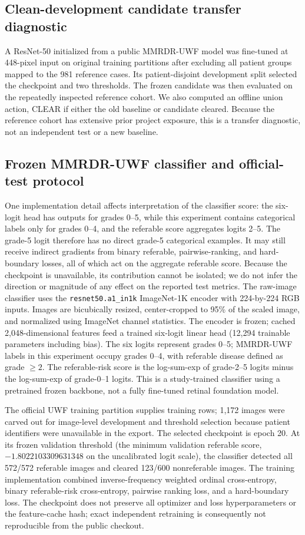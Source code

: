 \documentclass[11pt]{article}
\begin{document}
\subsection{Clean-development candidate transfer diagnostic}
A ResNet-50 initialized from a public MMRDR-UWF model was fine-tuned at 448-pixel input on original training partitions after excluding all patient groups mapped to the 981 reference cases. Its patient-disjoint development split selected the checkpoint and two thresholds. The frozen candidate was then evaluated on the repeatedly inspected reference cohort. We also computed an offline union action, CLEAR if either the old baseline or candidate cleared. Because the reference cohort has extensive prior project exposure, this is a transfer diagnostic, not an independent test or a new baseline.

\subsection{Frozen MMRDR-UWF classifier and official-test protocol}
One implementation detail affects interpretation of the classifier score: the six-logit head has outputs for grades 0--5, while this experiment contains categorical labels only for grades 0--4, and the referable score aggregates logits 2--5. The grade-5 logit therefore has no direct grade-5 categorical examples. It may still receive indirect gradients from binary referable, pairwise-ranking, and hard-boundary losses, all of which act on the aggregate referable score. Because the checkpoint is unavailable, its contribution cannot be isolated; we do not infer the direction or magnitude of any effect on the reported test metrics.
The raw-image classifier uses the \texttt{resnet50.a1\_in1k} ImageNet-1K encoder with 224-by-224 RGB inputs. Images are bicubically resized, center-cropped to 95\% of the scaled image, and normalized using ImageNet channel statistics. The encoder is frozen; cached 2,048-dimensional features feed a trained six-logit linear head (12,294 trainable parameters including bias). The six logits represent grades 0--5; MMRDR-UWF labels in this experiment occupy grades 0--4, with referable disease defined as grade $\geq2$. The referable-risk score is the log-sum-exp of grade-2--5 logits minus the log-sum-exp of grade-0--1 logits. This is a study-trained classifier using a pretrained frozen backbone, not a fully fine-tuned retinal foundation model.

The official UWF training partition supplies training rows; 1,172 images were carved out for image-level development and threshold selection because patient identifiers were unavailable in the export. The selected checkpoint is epoch 20. At its frozen validation threshold (the minimum validation referable score, $-1.8022103309631348$ on the uncalibrated logit scale), the classifier detected all 572/572 referable images and cleared 123/600 nonreferable images. The training implementation combined inverse-frequency weighted ordinal cross-entropy, binary referable-risk cross-entropy, pairwise ranking loss, and a hard-boundary loss. The checkpoint does not preserve all optimizer and loss hyperparameters or the feature-cache hash; exact independent retraining is consequently not reproducible from the public checkout.
\end{document}

